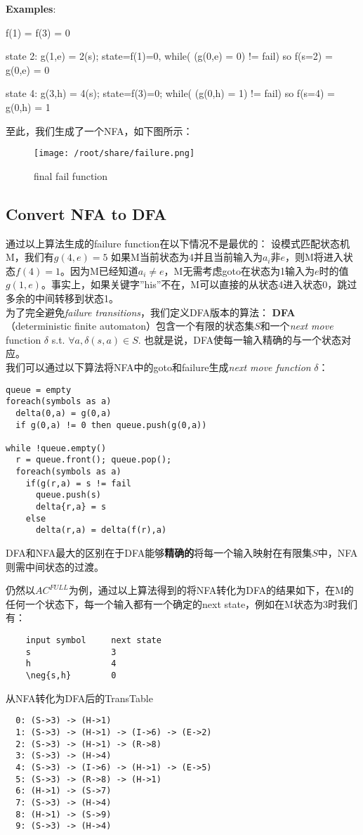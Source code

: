 \documentclass{article}
\begin{document}
\textbf{Examples}:
\begin{list}{}{}
  \item  f(1) = f(3) = 0
  \item  state 2: g(1,e) = 2(s); state=f(1)=0, while( (g(0,e) = 0) != fail) so f(s=2) = g(0,e) = 0
  \item  state 4: g(3,h) = 4(s); state=f(3)=0; while( (g(0,h) = 1) != fail) so f(s=4) = g(0,h) = 1
\end{list}
至此，我们生成了一个NFA，如下图所示：
\begin{figure}[h]
  \centering
  \caption{final fail function}
\texttt{[image: /root/share/failure.png]}
\end{figure}
\subsection{Convert NFA to DFA}

通过以上算法生成的failure function在以下情况不是最优的：
设模式匹配状态机M，我们有$g(4,e) = 5$
如果M当前状态为4并且当前输入为$a_i$非$e$，则M将进入状态$f(4)=1$。因为M已经知道$a_i \ne e$，M无需考虑goto在状态为1输入为$e$时的值$g(1,e)$。事实上，如果关键字”his”不在，M可以直接的从状态4进入状态0，跳过多余的中间转移到状态1。\\
为了完全避免\textit{failure transitions}，我们定义DFA版本的算法：
\textbf{DFA}（deterministic finite automaton）包含一个有限的状态集$S$和一个\textit{next move} function $\delta$ s.t. $\forall a, \delta(s,a) \in S$. 也就是说，DFA使每一输入精确的与一个状态对应。\\
我们可以通过以下算法将NFA中的goto和failure生成\textit{next move function} $\delta$：
\begin{lstlisting}
queue = empty
foreach(symbols as a)
  delta(0,a) = g(0,a)
  if g(0,a) != 0 then queue.push(g(0,a))

while !queue.empty()
  r = queue.front(); queue.pop();
  foreach(symbols as a)
    if(g(r,a) = s != fail
      queue.push(s)
      delta{r,a} = s
    else
      delta(r,a) = delta(f(r),a)
\end{lstlisting}

DFA和NFA最大的区别在于DFA能够\textbf{精确的}将每一个输入映射在有限集$S$中，NFA则需中间状态的过渡。

仍然以$AC^{FULL}$为例，通过以上算法得到的将NFA转化为DFA的结果如下，在M的任何一个状态下，每一个输入都有一个确定的next state，例如在M状态为3时我们有：
\begin{verbatim}
    input symbol     next state
    s                3
    h                4
    \neg{s,h}        0
\end{verbatim}
从NFA转化为DFA后的TransTable
\begin{verbatim}
  0: (S->3) -> (H->1)
  1: (S->3) -> (H->1) -> (I->6) -> (E->2)
  2: (S->3) -> (H->1) -> (R->8)
  3: (S->3) -> (H->4)
  4: (S->3) -> (I->6) -> (H->1) -> (E->5)
  5: (S->3) -> (R->8) -> (H->1)
  6: (H->1) -> (S->7)
  7: (S->3) -> (H->4)
  8: (H->1) -> (S->9)
  9: (S->3) -> (H->4)
\end{verbatim}
\end{document}
